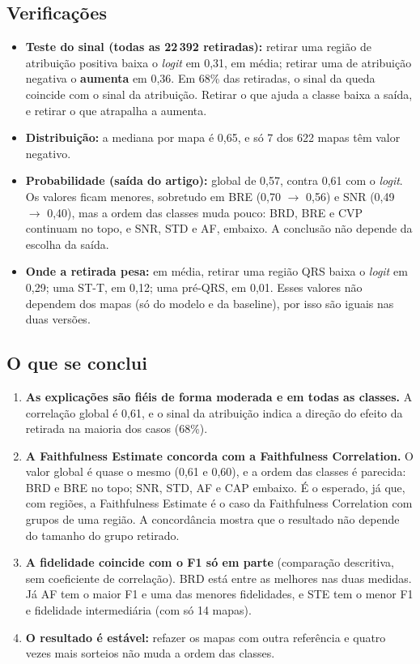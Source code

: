\documentclass[11pt,a4paper]{article}
\begin{document}
\subsection{Verificações}
\begin{itemize}
\item \textbf{Teste do sinal (todas as 22\,392 retiradas):} retirar uma região de atribuição positiva baixa o \textit{logit} em 0,31, em média; retirar uma de atribuição negativa o \textbf{aumenta} em 0,36. Em 68\% das retiradas, o sinal da queda coincide com o sinal da atribuição. Retirar o que ajuda a classe baixa a saída, e retirar o que atrapalha a aumenta.
\item \textbf{Distribuição:} a mediana por mapa é 0,65, e só 7 dos 622 mapas têm valor negativo.
\item \textbf{Probabilidade (saída do artigo):} global de 0,57, contra 0,61 com o \textit{logit}. Os valores ficam menores, sobretudo em BRE (0,70 $\rightarrow$ 0,56) e SNR (0,49 $\rightarrow$ 0,40), mas a ordem das classes muda pouco: BRD, BRE e CVP continuam no topo, e SNR, STD e AF, embaixo. A conclusão não depende da escolha da saída.
\item \textbf{Onde a retirada pesa:} em média, retirar uma região QRS baixa o \textit{logit} em 0,29; uma ST-T, em 0,12; uma pré-QRS, em 0,01. Esses valores não dependem dos mapas (só do modelo e da baseline), por isso são iguais nas duas versões.
\end{itemize}

\subsection{O que se conclui}
\begin{enumerate}
\item \textbf{As explicações são fiéis de forma moderada e em todas as classes.} A correlação global é 0,61, e o sinal da atribuição indica a direção do efeito da retirada na maioria dos casos (68\%).
\item \textbf{A Faithfulness Estimate concorda com a Faithfulness Correlation.} O valor global é quase o mesmo (0,61 e 0,60), e a ordem das classes é parecida: BRD e BRE no topo; SNR, STD, AF e CAP embaixo. É o esperado, já que, com regiões, a Faithfulness Estimate é o caso da Faithfulness Correlation com grupos de uma região. A concordância mostra que o resultado não depende do tamanho do grupo retirado.
\item \textbf{A fidelidade coincide com o F1 só em parte} (comparação descritiva, sem coeficiente de correlação). BRD está entre as melhores nas duas medidas. Já AF tem o maior F1 e uma das menores fidelidades, e STE tem o menor F1 e fidelidade intermediária (com só 14 mapas).
\item \textbf{O resultado é estável:} refazer os mapas com outra referência e quatro vezes mais sorteios não muda a ordem das classes.
\end{enumerate}
\end{document}
